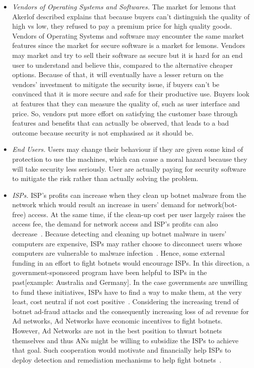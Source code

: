 \begin{itemize}
\item \textit{Vendors of Operating Systems and Softwares.} The market for lemons that Akerlof described explains that because buyers can’t distinguish the quality of high vs low, they refused to pay a premium price for high quality goods. Vendors of Operating Systems and software may encounter the same market features since the market for secure software is a market for lemons. Vendors may market and try to sell their software as secure but it is hard for an end user to understand and believe this, compared to the alternative cheaper options. Because of that, it will eventually have a lesser return on the vendors’ investment to mitigate the security issue, if buyers can’t be convinced that it is more secure and safe for their productive use. Buyers look at features that they can measure the quality of, such as user interface and price. So, vendors put more effort on satisfying the customer base through features and benefits that can actually be observed, that leads to a bad outcome because security is not emphasised as it should be.

\item \textit{End Users.} Users may change their behaviour if they are given some kind of protection to use the machines, which can cause a moral hazard because they will take security less seriously. User are actually paying for security software to mitigate the risk rather than actually solving the problem.


\item \textit{ISPs.} ISP’s profits can increase when they clean up botnet malware from the network which would result an increase in users’ demand for network(bot-free) access. At the same time, if the clean-up cost per user largely raises the access fee, the demand for network access and ISP’s profits can also decrease~\cite{asghari2010botnet}. Because detecting and cleaning up botnet malware in users’ computers are expensive, ISPs may rather choose to disconnect users whose computers are vulnerable to malware infection~\cite{kinukawa2012should}. Hence, some external funding in an effort to fight botnets would encourage ISPs. In this direction, a government-sponsored program have been helpful to ISPs in the past[example: Australia and Germany]. In the case governments are unwilling to fund these initiatives, ISPs have to find a way to make them, at the very least, cost neutral if not cost positive~\cite{asghari2010botnet}. Considering the increasing trend of botnet ad-fraud attacks and the consequently increasing loss of ad revenue for Ad networks, Ad Networks have economic incentives to fight botnets. However, Ad Networks are not in the best position to thwart botnets themselves and thus ANs might be willing to subsidize the ISPs to achieve that goal. Such cooperation would motivate and financially help ISPs to deploy detection and remediation mechanisms to help fight botnets~\cite{vratonjic2010isps}.

\end{itemize}

